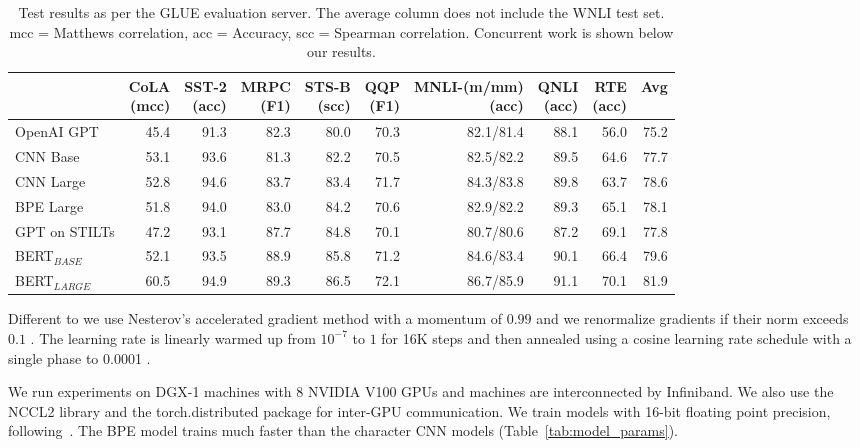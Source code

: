 \documentclass[11pt,a4paper]{article}
\begin{document}
\begin{table*}[t]
\centering
\begin{tabular}{lrrrrrrrrr}
\toprule
& \thead{CoLA\\(mcc)} & \thead{SST-2\\(acc)} & \thead{MRPC\\(F1)} & \thead{STS-B\\(scc)} & \thead{QQP\\(F1)} & \thead{MNLI-(m/mm)\\(acc)} & \thead{QNLI\\(acc)} & \thead{RTE\\(acc)} & Avg \\
\midrule
OpenAI GPT     & 45.4 & 91.3 & 82.3 & 80.0 & 70.3 & 82.1/81.4 & 88.1 & 56.0 & 75.2\\
\midrule
CNN Base       & 53.1 & 93.6 & 81.3 & 82.2 & 70.5 & 82.5/82.2 & 89.5 & 64.6 & 77.7 \\
CNN Large      & 52.8 & 94.6 & 83.7 & 83.4 & 71.7 & 84.3/83.8 & 89.8 & 63.7 & 78.6 \\
BPE Large      & 51.8 & 94.0 & 83.0 & 84.2 & 70.6 & 82.9/82.2 & 89.3 & 65.1 & 78.1 \\
\midrule
GPT on STILTs  & 47.2 & 93.1 & 87.7 & 84.8 & 70.1 & 80.7/80.6 & 87.2 & 69.1 & 77.8 \\
BERT$_{BASE}$  & 52.1 & 93.5 & 88.9 & 85.8 & 71.2 & 84.6/83.4 & 90.1 & 66.4 & 79.6 \\
BERT$_{LARGE}$ & 60.5 & 94.9 & 89.3 & 86.5 & 72.1 & 86.7/85.9 & 91.1 & 70.1 & 81.9 \\
\bottomrule
\end{tabular}
\caption{Test results as per the GLUE evaluation server. The average column does not include the WNLI test set. mcc = Matthews correlation, acc = Accuracy, scc = Spearman correlation.
Concurrent work is shown below our results.}
\label{tab:glue}
\end{table*}


Different to \citet{vaswani2017transformer} we use Nesterov's accelerated gradient method \citep{sutskever2013icml} with a momentum of $0.99$ and we renormalize gradients if their norm exceeds $0.1$ \citep{pascanu2013difficulty}.
The learning rate is linearly warmed up from $10^{-7}$ to $1$ for 16K steps and then annealed using a cosine learning rate schedule with a single phase to 0.0001 \citep{cosine}.

We run experiments on DGX-1 machines with 8 NVIDIA V100 GPUs and machines are interconnected by Infiniband.
We also use the NCCL2 library and the torch.distributed package for inter-GPU communication.
We train models with 16-bit floating point precision, following~\citet{ott2018scaling}.
The BPE model trains much faster than the character CNN models (Table~\ref{tab:model_params}).
\end{document}
